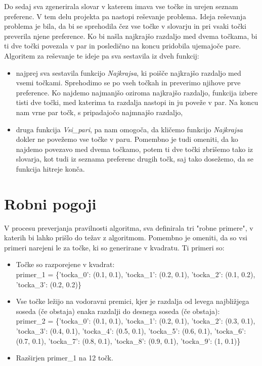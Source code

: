\documentclass[12pt, a4paper]{article}
\begin{document}
Do sedaj sva zgenerirala slovar v katerem imava vse točke in urejen seznam preferenc.  V tem delu projekta pa nastopi reševanje problema. Ideja reševanja problema je bila, da bi se sprehodila čez vse točke v slovarju in pri vsaki točki preverila njene preference. Ko bi našla najkrajšo razdaljo med dvema točkama, bi ti dve točki povezala v par in posledično na koncu pridobila ujemajoče pare. Algoritem za reševanje te ideje pa sva sestavila iz dveh funkcij:
\begin{itemize}
	\item najprej sva sestavila funkcijo \textit{Najkrajsa}, ki poišče najkrajšo razdaljo med vsemi točkami. Sprehodimo se po vseh točkah in preverimo njihove prve preference. Ko najdemo najmanjšo oziroma najkrajšo razdaljo, funkcija izbere tisti dve točki, med katerima ta razdalja nastopi in ju poveže v par. Na koncu nam vrne par točk, s pripadajočo najmnajšo razdaljo,
	\item druga funkcija \textit{Vsi_pari}, pa nam omogoča, da kličemo funkcijo \textit{Najkrajsa} dokler ne povežemo vse točke v paru. Pomembno je tudi omeniti, da ko najdemo povezavo med dvema točkamo, potem ti dve točki zbrišemo tako iz slovarja, kot tudi iz seznama preferenc drugih točk, saj tako dosežemo, da se funkcija hitreje konča.
\end{itemize}


\section{Robni pogoji}
V procesu preverjanja pravilnosti algoritma, sva definirala tri "robne primere", v katerih bi lahko prišlo do težav z algoritmom. Pomembno je omeniti, da so vsi primeri narejeni le za točke, ki so generirane v kvadratu. Ti primeri so:
\begin{itemize}
\item Točke so razporejene v kvadrat:\\
	primer_1 = \{'tocka_0': (0.1, 0.1), 'tocka_1': (0.2, 0.1),  'tocka_2': (0.1,
	0.2),  'tocka_3': (0.2, 0.2)\}


\item Vse točke ležijo na vodoravni premici, kjer je razdalja od levega najbližjega soseda (če obstaja) enaka razdalji do desnega soseda (če obstaja):\\
	    primer_2 = \{'tocka_0': (0.1, 0.1), 'tocka_1': (0.2, 0.1), 'tocka_2': (0.3, 0.1),  'tocka_3': (0.4, 0.1),
           'tocka_4': (0.5, 0.1), 'tocka_5': (0.6, 0.1), 'tocka_6': (0.7, 0.1),  'tocka_7': (0.8, 0.1),
           'tocka_8': (0.9, 0.1), 'tocka_9': (1, 0.1)\}

\item Razširjen primer_1 na 12 točk.\\


\end{itemize} 
\end{document}
